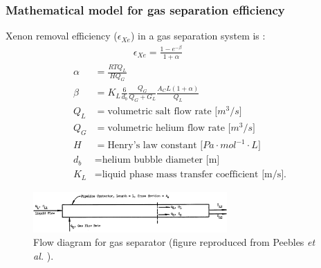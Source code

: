 \begin{frame}
  \frametitle{Mathematical model for gas separation efficiency}
  		\vspace{-1mm}
Xenon removal efficiency ($\epsilon_{Xe}$) in a gas separation system is 
\cite{peebles_removal_1968, sada_gas-liquid_1987}:
\begin{align}
& \qquad\qquad \epsilon_{Xe} = \frac{1-e^{-\beta}}{1+\alpha} \nonumber \\
\alpha &= \frac{RTQ_{L}}{HQ_{G}} \nonumber \\
\beta &= K_L \frac{6}{d_b} \frac{Q_G}{Q_G+G_L} \frac{A_C L (1+\alpha)}{Q_{L}} 
\nonumber \\
Q_{L}&= \mbox{volumetric salt flow rate [$m^3/s$]} \nonumber \\
Q_{G}&= \mbox{volumetric helium flow rate [$m^3/s$]} \nonumber \\
H &= \mbox{Henry's law constant [$Pa\cdot mol^{-1}\cdot L$]} \nonumber \\
d_b &= \mbox{helium bubble diameter [m]} \nonumber \\
K_L &= \mbox{liquid phase mass transfer coefficient [m/s].} \nonumber
\end{align}
		\vspace{-6mm}
  \begin{figure}[t]
	\includegraphics[width=0.66\textwidth]{./images/pipeline_contactor.png}
	\vspace{-3mm}
	\caption{Flow diagram for gas separator (figure reproduced from Peebles 
		\emph{et al.} \cite{peebles_removal_1968}).}
\end{figure}

\end{frame}




